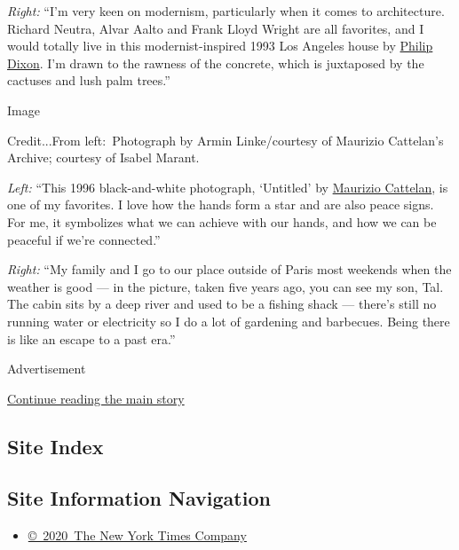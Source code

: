 \emph{Right:} ``I'm very keen on modernism, particularly when it comes
to architecture. Richard Neutra, Alvar Aalto and Frank Lloyd Wright are
all favorites, and I would totally live in this modernist-inspired 1993
Los Angeles house by
\href{https://www.architecturaldigest.com/gallery/inside-the-most-instagrammed-house-in-los-angeles}{Philip
Dixon}. I'm drawn to the rawness of the concrete, which is juxtaposed by
the cactuses and lush palm trees.''

Image

Credit...From left:~Photograph by Armin Linke/courtesy of Maurizio
Cattelan's Archive; courtesy of Isabel Marant.

\emph{Left:} ``This 1996 black-and-white photograph, `Untitled' by
\href{https://www.nytimes3xbfgragh.onion/2020/05/14/arts/maurizio-cattelan-bedtime-stories-virus.html}{Maurizio
Cattelan}, is one of my favorites. I love how the hands form a star and
are also peace signs. For me, it symbolizes what we can achieve with our
hands, and how we can be peaceful if we're connected.''

\emph{Right:} ``My family and I go to our place outside of Paris most
weekends when the weather is good --- in the picture, taken five years
ago, you can see my son, Tal. The cabin sits by a deep river and used to
be a fishing shack --- there's still no running water or electricity so
I do a lot of gardening and barbecues. Being there is like an escape to
a past era.''

Advertisement

\protect\hyperlink{after-bottom}{Continue reading the main story}

\hypertarget{site-index}{%
\subsection{Site Index}\label{site-index}}

\hypertarget{site-information-navigation}{%
\subsection{Site Information
Navigation}\label{site-information-navigation}}

\begin{itemize}
\tightlist
\item
  \href{https://help.nytimes3xbfgragh.onion/hc/en-us/articles/115014792127-Copyright-notice}{©~2020~The
  New York Times Company}
\end{itemize}

